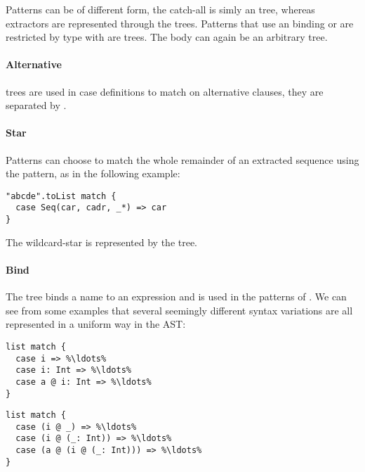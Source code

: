 Patterns can be of different form, the catch-all \src{\_} is simly an  tree, whereas extractors are represented through the  trees. Patterns that use an  binding or are restricted by type with \src{:} are  trees. The body can again be an arbitrary tree.

\paragraph{Alternative} 

\noindent {} trees are used in case definitions to match on alternative clauses, they are separated by \src{|}.

\paragraph{Star} 

\noindent Patterns can choose to match the whole remainder of an extracted sequence using the \src{\_*} pattern, as in the following example:

\begin{lstlisting}
"abcde".toList match {
  case Seq(car, cadr, _*) => car 
}
\end{lstlisting}

The wildcard-star is represented by the  tree.

\paragraph{Bind} 

\noindent The  tree binds a name to an expression and is used in the patterns of . We can see from some examples that several seemingly different syntax variations are all represented in a uniform way in the AST:

\begin{multicols}{2}
\begin{lstlisting}
list match {
  case i => %\ldots%
  case i: Int => %\ldots%
  case a @ i: Int => %\ldots%
}
\end{lstlisting}
\begin{lstlisting}
list match {
  case (i @ _) => %\ldots%
  case (i @ (_: Int)) => %\ldots%
  case (a @ (i @ (_: Int))) => %\ldots% 
}
\end{lstlisting}
\end{multicols}


